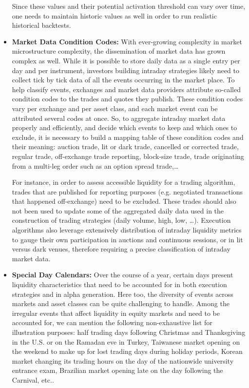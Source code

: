 \begin{itemize}
Since these values and their potential activation threshold can vary over time, one needs to maintain historic values as well in order to run realistic historical backtests.

\item \textbf{Market Data Condition Codes:} With ever-growing complexity in market microstructure complexity, the dissemination of market data has grown complex as well. While it is possible to store daily data as a single entry per day and per instrument, investors building intraday strategies likely need to collect tick by tick data of all the events occurring in the market place. To help classify events, exchanges and market data providers attribute so-called condition codes to the trades and quotes they publish. These condition codes vary per exchange and per asset class, and each market event can be attributed several codes at once. So, to aggregate intraday market data properly and efficiently, and decide which events to keep and which ones to exclude, it is necessary to build a mapping table of these condition codes and their meaning: auction trade, lit or dark trade, cancelled or corrected trade, regular trade, off-exchange trade reporting, block-size trade, trade originating from a multi-leg order such as an option spread trade,\dots

For instance, in order to assess accessible liquidity for a trading algorithm, trades that are published for reporting purposes (e.g. negotiated transactions that happened off-exchange) need to be excluded. These trades should also not been used to update some of the aggregated daily data used in the construction of trading strategies (daily volume, high, low, \dots). Execution algorithms also leverage extensively distribution of intraday liquidity metrics to gauge their own participation in auctions and continuous sessions, or in lit versus dark venues, therefore requiring a precise classification of intraday market data. 


\item \textbf{Special Day Calendars:} Over the course of a year, certain days present liquidity characteristics that need to be accounted for in both execution strategies and in alpha generation. Here too, the diversity of events across markets and asset classes can be quite challenging to handle. Among the irregular events that affect liquidity in equity markets and need to be accounted for, we can mention the following non-exhaustive list for illustration purposes: half trading days following Christmas and Thanksgiving in the U.S. or on the Ramadan eve in Turkey, Taiwanese market opening on the weekend to make up for lost trading days during holiday periods, Korean market changing its trading hours on the day of the nationwide university entrance exam, Brazilian market opening late on the day following the Carnival, etc..


\end{itemize}

